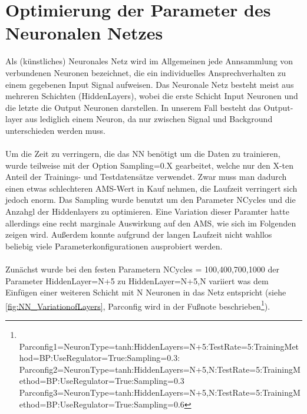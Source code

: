 \section{Optimierung der Parameter des Neuronalen Netzes}
Als (künstliches) Neuronales Netz wird im Allgemeinen jede Annsammlung von verbundenen Neuronen bezeichnet, die ein individuelles Ansprechverhalten zu einem gegebenen Input Signal aufweisen. Das Neuronale Netz besteht meist aus mehreren Schichten (HiddenLayers), wobei die erste Schicht Input Neuronen und die letzte die Output Neuronen darstellen. In unserem Fall besteht das Output-layer aus lediglich einem Neuron, da nur zwischen Signal und Background unterschieden werden muss.\\ \\
Um die Zeit zu verringern, die das NN benötigt um die Daten zu trainieren, wurde teilweise mit der Option Sampling=0.X gearbeitet, welche nur den X-ten Anteil der Trainings- und Testdatensätze verwendet. Zwar muss man dadurch einen etwas schlechteren AMS-Wert in Kauf nehmen, die Laufzeit verringert sich jedoch enorm. Das Sampling wurde benutzt um den Parameter NCycles und die Anzahgl der Hiddenlayers zu optimieren. Eine Variation dieser Paramter hatte allerdings eine recht marginale Auswirkung auf den AMS, wie sich im Folgenden zeigen wird. Außerdem konnte aufgrund der langen Laufzeit nicht wahllos beliebig viele Parameterkonfigurationen ausprobiert werden.\\ \\
Zunächst wurde bei den festen Parametern NCycles = 100,400,700,1000 der Parameter HiddenLayer=N+5 zu HiddenLayer=N+5,N variiert was dem Einfügen einer weiteren Schicht mit N Neuronen in das Netz entspricht (siehe \ref{fig:NN_VariationofLayers}, Parconfig wird in der Fußnote beschrieben\footnote{\\ Parconfig1=NeuronType=tanh:HiddenLayers=N+5:TestRate=5:TrainingMethod=BP:UseRegulator=True:Sampling=0.3:\\
Parconfig2=NeuronType=tanh:HiddenLayers=N+5,N:TestRate=5:TrainingMethod=BP:UseRegulator=True:Sampling=0.3\\
Parconfig3=NeuronType=tanh:HiddenLayers=N+5,N:TestRate=5:TrainingMethod=BP:UseRegulator=True:Sampling=0.6}). 

